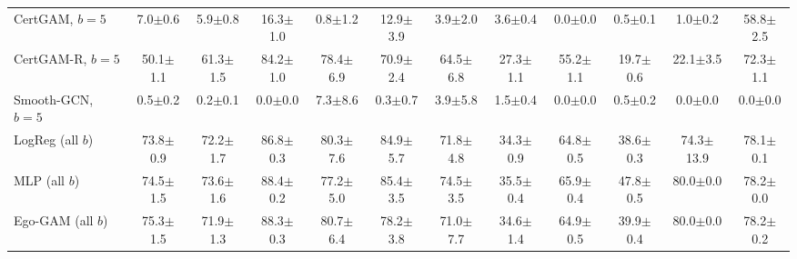 \begin{table}[!t]
{\begin{tabular}{lccccccccccc}
CertGAM, $b=5$ & 7.0$\pm$0.6 & 5.9$\pm$0.8 & 16.3$\pm$1.0 & 0.8$\pm$1.2 & 12.9$\pm$3.9 & 3.9$\pm$2.0 & 3.6$\pm$0.4 & 0.0$\pm$0.0 & 0.5$\pm$0.1 & 1.0$\pm$0.2 & 58.8$\pm$2.5 \\
CertGAM-R, $b=5$ & 50.1$\pm$1.1 & 61.3$\pm$1.5 & 84.2$\pm$1.0 & 78.4$\pm$6.9 & 70.9$\pm$2.4 & 64.5$\pm$6.8 & 27.3$\pm$1.1 & 55.2$\pm$1.1 & 19.7$\pm$0.6 & 22.1$\pm$3.5 & 72.3$\pm$1.1 \\
Smooth-GCN, $b=5$ & 0.5$\pm$0.2 & 0.2$\pm$0.1 & 0.0$\pm$0.0 & 7.3$\pm$8.6 & 0.3$\pm$0.7 & 3.9$\pm$5.8 & 1.5$\pm$0.4 & 0.0$\pm$0.0 & 0.5$\pm$0.2 & 0.0$\pm$0.0 & 0.0$\pm$0.0 \\
LogReg (all $b$) & 73.8$\pm$0.9 & 72.2$\pm$1.7 & 86.8$\pm$0.3 & 80.3$\pm$7.6 & 84.9$\pm$5.7 & 71.8$\pm$4.8 & 34.3$\pm$0.9 & 64.8$\pm$0.5 & 38.6$\pm$0.3 & 74.3$\pm$13.9 & 78.1$\pm$0.1 \\
MLP (all $b$) & 74.5$\pm$1.5 & 73.6$\pm$1.6 & 88.4$\pm$0.2 & 77.2$\pm$5.0 & 85.4$\pm$3.5 & 74.5$\pm$3.5 & 35.5$\pm$0.4 & 65.9$\pm$0.4 & 47.8$\pm$0.5 & 80.0$\pm$0.0 & 78.2$\pm$0.0 \\
Ego-GAM (all $b$) & 75.3$\pm$1.5 & 71.9$\pm$1.3 & 88.3$\pm$0.3 & 80.7$\pm$6.4 & 78.2$\pm$3.8 & 71.0$\pm$7.7 & 34.6$\pm$1.4 & 64.9$\pm$0.5 & 39.9$\pm$0.4 & 80.0$\pm$0.0 & 78.2$\pm$0.2 \\
\bottomrule
\end{tabular}}
\end{table}
